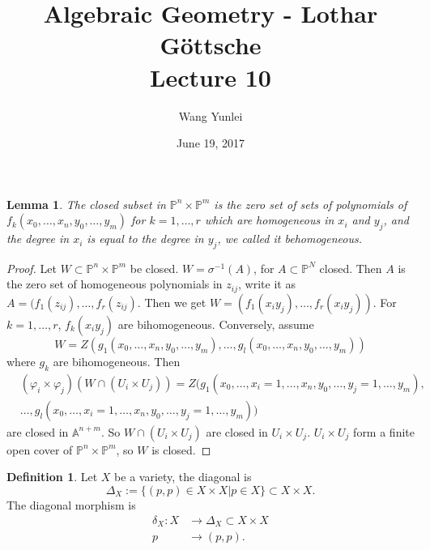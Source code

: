\documentclass{amsart}
\theoremstyle{plain}
\newtheorem{lemma}{Lemma}
\theoremstyle{definition}
\newtheorem{definition}{Definition}
\theoremstyle{remark}
\numberwithin{equation}{section}
\begin{document}
\title[Complete-simple distributive lattices]
{Algebraic Geometry - Lothar G\"{o}ttsche \\
	Lecture 10}
\author{Wang Yunlei}
\date{June 19, 2017}
 
\maketitle

 \begin{lemma}
 	The closed subset in $ \mathbb{P}^n\times \mathbb{P}^m $ is the zero set of sets of polynomials of $ f_k(x_0,\dots,x_n,y_0,\dots,y_m) $ for $ k=1,\dots,r $ which are homogeneous in  $ x_i $ and $ y_j $, and the degree in $ x_i $ is equal to the degree in $ y_j $, we called it behomogeneous.
 \end{lemma}
 \begin{proof}
 	Let $ W\subset \mathbb{P}^n\times \mathbb{P}^m $ be closed. $ W=\sigma^{-1}(A) $, for $ A\subset \mathbb{P}^N $ closed.
 	Then $ A $ is the zero set of homogeneous polynomials in $ z_{ij} $, write it as $ A=(f_1(z_{ij}),\dots,f_r(z_{ij}) $. Then we get $ W=(f_1(x_iy_j),\dots,f_r(x_iy_j)) $.  For $ k=1,\dots,r $, $ f_k(x_iy_j) $ are bihomogeneous. Conversely, assume $$ W=Z( g_1(x_0,\dots,x_n,y_0,\dots,y_m),  \dots,g_l(x_0,\dots,x_n,y_0,\dots,y_m )) $$
 	where $ g_{k} $ are bihomogeneous. Then
 	$$
 	\begin{array}{cc}
 	 	{} & (\varphi_i\times\varphi_j)(W\cap (U_i\times U_j))=Z( g_1(x_0,\dots,x_i=1,\dots,x_n,y_0,\dots,y_j=1,\dots,y_m),\\
 	 	{} & \dots,g_l(x_0,\dots,x_i=1,\dots,x_n,y_0,\dots,y_j=1,\dots,y_m) )
 	\end{array}
 	$$
 	are closed in $\mathbb{A}^{n+m}  $. So $ W\cap (U_i\times U_j) $ are closed in $ U_i\times U_j $. $ U_i\times U_j $ form a finite open cover of $ \mathbb{P}^n\times \mathbb{P}^m $, so $ W $ is closed.
 \end{proof}
 \begin{definition}
 	Let $ X $ be a variety, the diagonal is
 	$$
 	\Delta_X:=\{ (p,p)\in X\times X|p\in X \}\subset X\times X.
 	$$
 	The diagonal morphism is
 	$$\begin{array}{cc}
 	\delta_X:X & \to \Delta_X\subset X\times X\\
 	p &\to (p,p).
 	\end{array}$$
 \end{definition}
\end{document}
